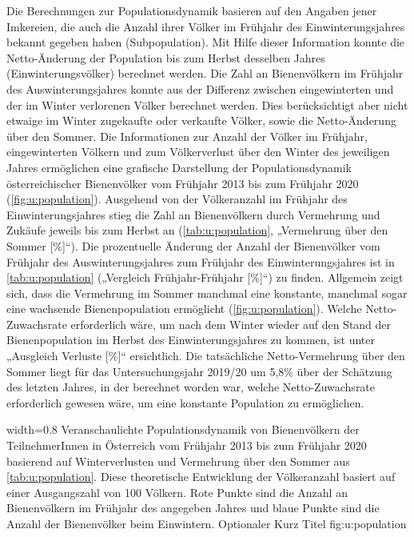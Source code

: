 Die Berechnungen zur Populationsdynamik basieren auf den Angaben jener Imkereien, die auch die Anzahl ihrer Völker im Frühjahr des Einwinterungsjahres bekannt gegeben haben (Subpopulation). Mit Hilfe dieser Information konnte die Netto-Änderung der Population bis zum Herbst desselben Jahres (Einwinterungsvölker) berechnet werden. Die Zahl an Bienenvölkern im Frühjahr des Auswinterungsjahres konnte aus der Differenz zwischen eingewinterten und der im Winter verlorenen Völker berechnet werden. Dies berücksichtigt aber nicht etwaige im Winter zugekaufte oder verkaufte Völker, sowie die Netto-Änderung über den Sommer. Die Informationen zur Anzahl der Völker im Frühjahr, eingewinterten Völkern und zum Völkerverlust über den Winter des jeweiligen Jahres ermöglichen eine grafische Darstellung der Populationsdynamik österreichischer Bienenvölker vom Frühjahr 2013 bis zum Frühjahr 2020 (\cref{fig:u:population}).
\newline
Ausgehend von der Völkeranzahl im Frühjahr des Einwinterungsjahres stieg die Zahl an Bienenvölkern durch Vermehrung und Zukäufe jeweils bis zum Herbst an (\cref{tab:u:population}, „Vermehrung über den Sommer [\%]``). Die prozentuelle Änderung der Anzahl der Bienenvölker vom Frühjahr des Auswinterungsjahres zum Frühjahr des Einwinterungsjahres ist in \cref{tab:u:population} („Vergleich Frühjahr-Frühjahr [\%]``) zu finden. Allgemein zeigt sich, dass die Vermehrung im Sommer manchmal eine konstante, manchmal sogar eine wachsende Bienenpopulation ermöglicht (\cref{fig:u:population}). Welche Netto-Zuwachsrate erforderlich wäre, um nach dem Winter wieder auf den Stand der Bienenpopulation im Herbst des Einwinterungsjahres zu kommen, ist unter „Ausgleich Verluste [\%]`` ersichtlich. 
\newline
Die tatsächliche Netto-Vermehrung über den Sommer liegt für das Untersuchungsjahr 2019/20 um 5,8\% über der Schätzung des letzten Jahres, in der berechnet worden war, welche Netto-Zuwachsrate erforderlich gewesen wäre, um eine konstante Population zu ermöglichen.



  {width=0.8\textwidth} %
  {Veranschaulichte Populationsdynamik von Bienenvölkern der TeilnehmerInnen in Österreich vom Frühjahr 2013 bis zum Frühjahr 2020 basierend auf Winterverlusten und Vermehrung über den Sommer aus \cref{tab:u:population}. Diese theoretische Entwicklung der Völkeranzahl basiert auf einer Ausgangszahl von 100 Völkern. Rote Punkte sind die Anzahl an Bienenvölkern im Frühjahr des angegeben Jahres und blaue Punkte sind die Anzahl der Bienenvölker beim Einwintern.} %
  {Optionaler Kurz Titel} %
  {fig:u:population} %

